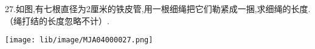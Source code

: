 27.如图,有七根直径为2厘米的铁皮管,用一根细绳把它们勒紧成一捆,求细绳的长度.（绳打结的长度忽略不计）.

\begin{flushright}

    \texttt{[image: lib/image/MJA04000027.png]}

\end{flushright}



